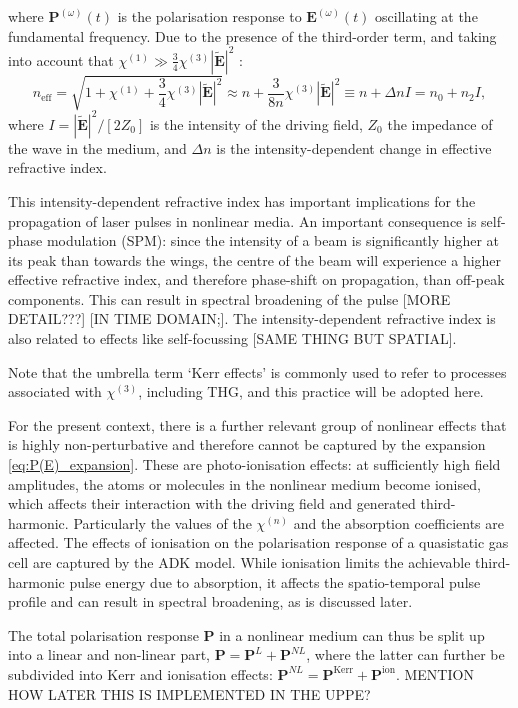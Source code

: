 \documentclass[a4paper]{jpconf}
\begin{document}
where $\mathbf{P}^{(\omega)}(t)$ is the polarisation response to $\mathbf{E}^{(\omega)}(t)$ oscillating at the fundamental frequency. Due to the presence of the third-order term, and taking into account that $\chi^{(1)} \gg \frac{3}{4} \chi^{(3)} |\tilde{\mathbf{E}}|^2$ :
\begin{equation}
n_\text{eff} = \sqrt{1 + \chi^{(1)} + \frac{3}{4} \chi^{(3)} |\tilde{\mathbf{E}}|^2} \approx n + \frac{3}{8n} \chi^{(3)} |\tilde{\mathbf{E}}|^2 \equiv n + \Delta n I = n_0 + n_2 I,
\end{equation}
where $I = |\tilde{\mathbf{E}}|^2/[2Z_0]$ is the intensity of the driving field, $Z_0$ the impedance of the wave in the medium, and $\Delta n$ is the intensity-dependent change in effective refractive index. \par 
This intensity-dependent refractive index has important implications for the propagation of laser pulses in nonlinear media. An important consequence is self-phase modulation (SPM): since the intensity of a beam is significantly higher at its peak than towards the wings, the centre of the beam will experience a higher effective refractive index, and therefore phase-shift on propagation, than off-peak components. This can result in spectral broadening of the pulse [MORE DETAIL???] [IN TIME DOMAIN;]. The intensity-dependent refractive index is also related to effects like self-focussing [SAME THING BUT SPATIAL]. \par 
Note that the umbrella term `Kerr effects' is commonly used to refer to processes associated with $\chi^{(3)}$, including THG, and this practice will be adopted here. \par 
For the present context, there is a further relevant group of nonlinear effects that is highly non-perturbative and therefore cannot be captured by the expansion \eqref{eq:P(E)_expansion}. These are photo-ionisation effects: at sufficiently high field amplitudes, the atoms or molecules in the nonlinear medium become ionised, which affects their interaction with the driving field and generated third-harmonic. Particularly the values of the $\chi^{(n)}$ and the absorption coefficients are affected. The effects of ionisation on the polarisation response of a quasistatic gas cell are captured by the ADK model. While ionisation limits the achievable third-harmonic pulse energy due to absorption, it affects the spatio-temporal pulse profile and can result in spectral broadening, as is discussed later. \par 
The total polarisation response $\mathbf{P}$ in a nonlinear medium can thus be split up into a linear and non-linear part, $\mathbf{P} = \mathbf{P}^L + \mathbf{P}^{NL}$, where the latter can further be subdivided into Kerr and ionisation effects: $\mathbf{P}^{NL} = \mathbf{P}^{\text{Kerr}} + \mathbf{P}^{\text{ion}}.$ MENTION HOW LATER THIS IS IMPLEMENTED IN THE UPPE?
\end{document}
